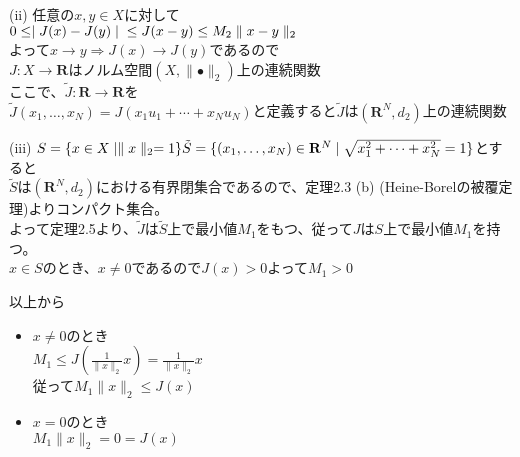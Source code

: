 \documentclass[12pt,a4paper]{article}
\begin{document}
     (ii) 任意の$x, y \in X$に対して\\
     $ 0 \leq \mid J(x) - J(y) \mid \\ \leq J(x - y) \\ \leq M_2 \parallel x - y \parallel_2$ \\
     よって$x \rightarrow y \Rightarrow J(x) \rightarrow J(y)$であるので \\ $J: X \rightarrow \mathbf{R}$はノルム空間$(X, \parallel\bullet\parallel_2)$上の連続関数\\
     ここで、$\tilde{J}: \mathbf{R} \rightarrow \mathbf{R}$を\\
    $\tilde{J}(x_1, \ldots ,x_N) = J(x_1 u_1 + \cdots + x_N u_N)$と定義すると$\tilde{J}$は$(\mathbf{R}^N, d_2)$上の連続関数
    
    (iii) $S = \lbrace x \in X \mid \parallel x \parallel_2 =1 \rbrace \\ \tilde{S} = \lbrace (x_1, \ldots, x_N) \in \mathbf{R}^N \mid \sqrt{x_1^2 + \cdots + x_N^2} = 1 \rbrace$とすると　\\
    $\tilde{S}$は$(\mathbf{R}^N, d_2)$における有界閉集合であるので、定理2.3 (b) (Heine-Borelの被覆定理)よりコンパクト集合。\\
    よって定理2.5より、$\tilde{J}$は$\tilde{S}$上で最小値$M_1$をもつ、従って$J$は$S$上で最小値$M_1$を持つ。\\
    $x\in S$のとき、$x \neq 0$であるので$J(x) > 0$よって$M_1 > 0$
    
    以上から
    \begin{itemize}
      \item $x \neq 0$のとき \\
      $M_1 \leq J (\frac{1}{\parallel x \parallel_2} x) = \frac{1}{\parallel x \parallel_2} x$ \\
        従って$M_1\parallel x \parallel_2 \leq J(x)$
      \item $x = 0$のとき \\ $M_1 \parallel x\parallel_2 = 0 = J(x)$
    \end{itemize}
\end{document}
